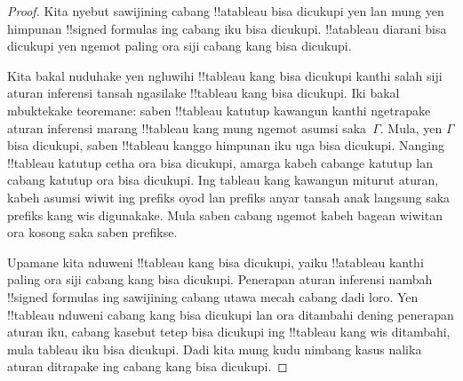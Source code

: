 \documentclass[../../../include/open-logic-section]{subfiles}
\begin{document}
\begin{proof}
Kita nyebut sawijining cabang !!a{tableau} bisa dicukupi yen lan
mung yen himpunan !!{signed formula}s ing cabang iku bisa dicukupi.
!!a{tableau} diarani bisa dicukupi yen ngemot paling ora siji cabang
kang bisa dicukupi.

Kita bakal nuduhake yen ngluwihi !!{tableau} kang bisa dicukupi
kanthi salah siji aturan inferensi tansah ngasilake !!{tableau}
kang bisa dicukupi. Iki bakal mbuktekake teoremane: saben !!{tableau}
katutup kawangun kanthi ngetrapake aturan inferensi marang
!!{tableau} kang mung ngemot asumsi saka~$\Gamma$. Mula, yen
$\Gamma$ bisa dicukupi, saben !!{tableau} kanggo himpunan iku uga
bisa dicukupi. Nanging !!{tableau} katutup cetha ora bisa dicukupi,
amarga kabeh cabange katutup lan cabang katutup ora bisa dicukupi.
Ing tableau kang kawangun miturut aturan, kabeh asumsi wiwit ing
prefiks oyod lan prefiks anyar tansah anak langsung saka prefiks
kang wis digunakake. Mula saben cabang ngemot kabeh bagean wiwitan
ora kosong saka saben prefikse.

Upamane kita nduweni !!{tableau} kang bisa dicukupi, yaiku
!!a{tableau} kanthi paling ora siji cabang kang bisa dicukupi.
Penerapan aturan inferensi nambah !!{signed formula}s ing sawijining
cabang utawa mecah cabang dadi loro. Yen !!{tableau} nduweni cabang
kang bisa dicukupi lan ora ditambahi dening penerapan aturan iku,
cabang kasebut tetep bisa dicukupi ing !!{tableau} kang wis
ditambahi, mula tableau iku bisa dicukupi. Dadi kita mung kudu
nimbang kasus nalika aturan ditrapake ing cabang kang bisa dicukupi.


\end{proof}
\end{document}
